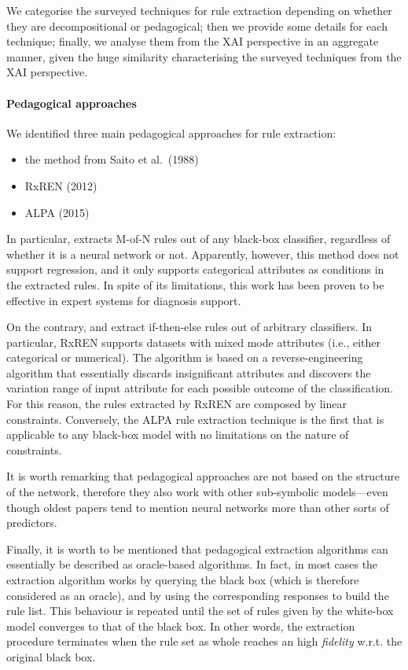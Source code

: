\documentclass[12pt,a4paper,openright,twoside]{book}
\begin{document}
We categorise the surveyed techniques for rule extraction depending on whether they are decompositional or pedagogical;
then we provide some details for each technique;
finally, we analyse them from the XAI perspective in an aggregate manner, given the huge similarity characterising the surveyed techniques from the XAI perspective.

\paragraph{Pedagogical approaches}

We identified three main pedagogical approaches for rule extraction:
\begin{itemize}
	\item the method from Saito et al.\ (1988) \cite{saito1988}
	\item RxREN (2012) \cite{Augasta2012}
	\item ALPA (2015) \cite{Fortuny2015}
\end{itemize}

In particular, \cite{saito1988} extracts M-of-N rules out of any black-box classifier, regardless of whether it is a neural network or not.
%
Apparently, however, this method does not support regression, and it only supports categorical attributes as conditions in the extracted rules.
%
In spite of its limitations, this work has been proven to be effective in expert systems for diagnosis support.

On the contrary, \cite{Augasta2012} and \cite{Fortuny2015} extract if-then-else rules out of arbitrary classifiers.
%
In particular, RxREN supports datasets with mixed mode attributes (i.e., either categorical or numerical).
%
The algorithm is based on a reverse-engineering algorithm that essentially discards insignificant attributes and discovers the variation range of input attribute for each possible outcome of the classification.
%
For this reason, the rules extracted by RxREN are composed by linear constraints.
%
Conversely, the ALPA rule extraction technique is the first that is applicable to any black-box model with no limitations on the nature of constraints.

It is worth remarking that pedagogical approaches are not based on the structure of the network, therefore they also work with other sub-symbolic models---even though oldest papers tend to mention neural networks more than other sorts of predictors.

Finally, it is worth to be mentioned that pedagogical extraction algorithms can essentially be described as oracle-based algorithms.
%
In fact, in most cases the extraction algorithm works by querying the black box (which is therefore considered as an oracle), and by using the corresponding responses to build the rule list.
%
This behaviour is repeated until the set of rules given by the white-box model converges to that of the black box.
%
In other words, the extraction procedure terminates when the rule set as whole reaches an high \emph{fidelity} w.r.t. the original black box.
\end{document}
